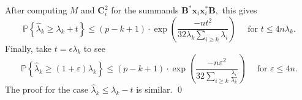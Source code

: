 \documentclass[pdf,mpa]{prosper}
\newcommand{\mat}[1]{\ensuremath{\mathbf{#1}}}
\newcommand{\Prob}[1]{\ensuremath{\mathbb{P}\left\{#1 \right\}}}
\renewcommand{\star}{*}
\begin{document}
\begin{slide}{}
 After computing $M$ and $\mat{C}_i^2$ for the summands $\mat{B}^\star \mat{x}_i \mat{x}_i^\star \mat{B},$ this gives
\[
 \Prob{\hat{\lambda}_k \geq \lambda_k +t} \leq (p-k+1)\cdot \exp\left( \frac{-nt^2}{32\lambda_k \sum_{i \geq k} \lambda_i } \right) \quad \text{ for } t \leq 4n \lambda_k.
\]
Finally, take $t = \epsilon \lambda_k$ to see
\[
 \Prob{\hat{\lambda}_k \geq (1+\varepsilon) \lambda_k} \leq (p-k+1)\cdot \exp\left( \frac{-n\varepsilon^2}{32\sum_{i \geq k} \frac{\lambda_i}{\lambda_k} } \right) \quad \text{ for } \varepsilon \leq 4n.
\]
The proof for the case $\hat{\lambda}_k \leq \lambda_k - t$ is similar.
\qed
\end{slide}
\end{document}

